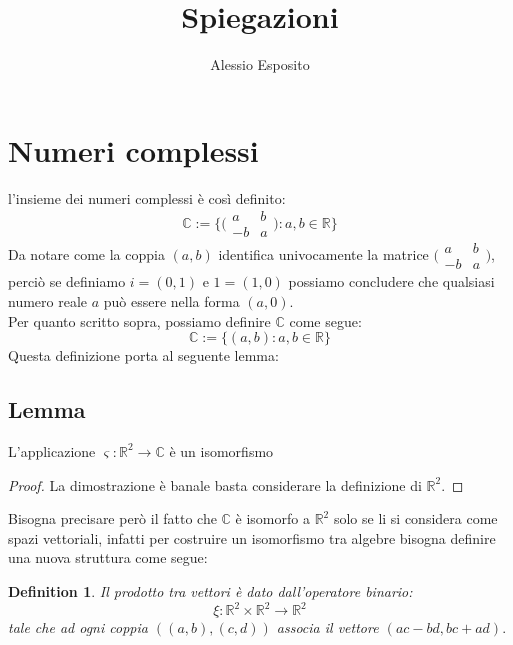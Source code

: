\documentclass{article}
\title{Spiegazioni}
\author{Alessio Esposito}
\newtheorem{definition}{Definition}
\begin{document}
\maketitle
    \section*{Numeri complessi}
        l'insieme dei numeri complessi è così definito:
        \begin{equation*}
            \mathbb{C} := \{ \big(\begin{smallmatrix} a & b \\ -b & a \end{smallmatrix} \big) : a,b \in \mathbb{R} \}
        \end{equation*}
        Da notare come la coppia $(a,b)$ identifica univocamente la matrice $\big(\begin{smallmatrix} a & b \\ -b & a \end{smallmatrix} \big)$, perciò se definiamo $i = (0,1)$ e $1 = (1, 0)$ possiamo concludere che qualsiasi numero reale $a$ può essere nella forma $(a,0)$. \\
        Per quanto scritto sopra, possiamo definire $\mathbb{C}$ come segue:
        \begin{equation*}
            \mathbb{C} := \{ (a,b) : a,b \in \mathbb{R} \}
        \end{equation*} 
        Questa definizione porta al seguente lemma:
       \subsection*{Lemma}
        L'applicazione $\varsigma : \mathbb{R}^2 \rightarrow \mathbb{C}$ è un isomorfismo
        \begin{proof}
            La dimostrazione è banale basta considerare la definizione di $\mathbb{R}^2$.    
        \end{proof}
    Bisogna precisare però il fatto che $\mathbb{C}$ è isomorfo a $\mathbb{R}^2$ solo se li si considera come spazi vettoriali, infatti per costruire un isomorfismo tra algebre bisogna definire una nuova struttura come segue:
    \begin{definition}
        Il prodotto tra vettori è dato dall'operatore binario: 
        \begin{equation*}
            \xi : \mathbb{R}^2 \times \mathbb{R}^2 \rightarrow \mathbb{R}^2
        \end{equation*}
        tale che ad ogni coppia $((a,b),(c,d))$ associa il vettore $(ac - bd, bc + ad).$

    \end{definition}
\end{document}
